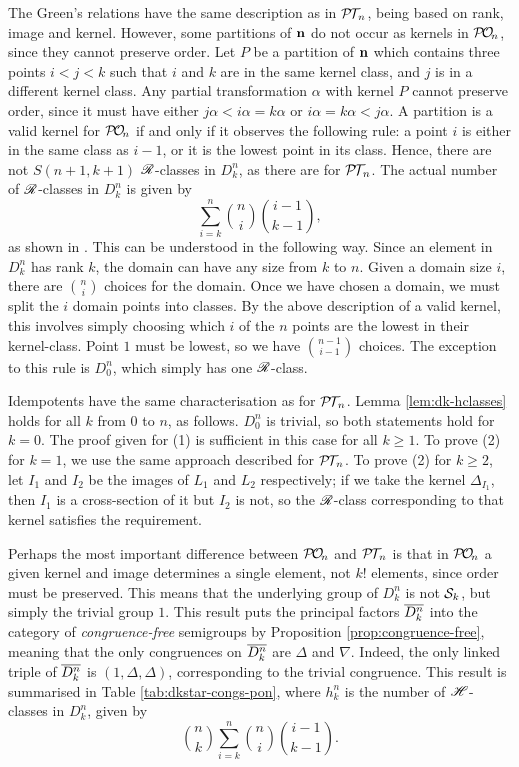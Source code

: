 The Green's relations have the same description as in $\mathcal{P\!T\!}_n$, being based on
rank, image and kernel.  However, some partitions of $\mathbf{n}$ do not occur as
kernels in $\mathcal{P\!O\!}_n$, since they cannot preserve order.  Let $P$ be a partition of
$\mathbf{n}$ which contains three points $i < j < k$ such that $i$ and $k$ are in the
same kernel class, and $j$ is in a different kernel class.  Any partial
transformation $\alpha$ with kernel $P$ cannot preserve order, since it must
have either $j\alpha < i\alpha = k\alpha$ or $i\alpha = k\alpha < j\alpha$.  A
partition is a valid kernel for $\mathcal{P\!O\!}_n$ if and only if it observes the following
rule: a point $i$ is either in the same class as $i-1$, or it is the lowest
point in its class.  Hence, there are not $S(n+1, k+1)$ $\mathrel{\mathscr{R}}$-classes in
$D_k^n$, as there are for $\mathcal{P\!T\!}_n$.  The actual number of $\mathrel{\mathscr{R}}$-classes in
$D_k^n$ is given by
$$\sum_{i=k}^n \binom{n}{i} \binom{i-1}{k-1},$$
as shown in \cite[Lemma 4.1]{pon}.  This can be understood in the following way.
Since an element in $D_k^n$ has rank $k$, the domain can have any size from $k$
to $n$.  Given a domain size $i$, there are $\binom{n}{i}$ choices for the
domain.  Once we have chosen a domain, we must split the $i$ domain points into
classes.  By the above description of a valid kernel, this involves simply
choosing which $i$ of the $n$ points are the lowest in their kernel-class.
Point $1$ must be lowest, so we have $\binom{n-1}{i-1}$ choices.  The exception
to this rule is $D_0^n$, which simply has one $\mathrel{\mathscr{R}}$-class.

Idempotents have the same characterisation as for $\mathcal{P\!T\!}_n$.  Lemma
\ref{lem:dk-hclasses} holds for all $k$ from $0$ to $n$, as follows.  $D_0^n$ is
trivial, so both statements hold for $k=0$.  The proof given for (1) is
sufficient in this case for all $k \geq 1$.  To prove (2) for $k=1$, we use the
same approach described for $\mathcal{P\!T\!}_n$.  To prove (2) for $k \geq 2$, let $I_1$ and
$I_2$ be the images of $L_1$ and $L_2$ respectively; if we take the kernel
$\Delta_{I_1}$, then $I_1$ is a cross-section of it but $I_2$ is not, so the
$\mathrel{\mathscr{R}}$-class corresponding to that kernel satisfies the requirement.

Perhaps the most important difference between $\mathcal{P\!O\!}_n$ and $\mathcal{P\!T\!}_n$ is that in
$\mathcal{P\!O\!}_n$ a given kernel and image determines a single element, not $k!$ elements,
since order must be preserved.  This means that the underlying group of $D_k^n$
is not $\mathcal{S}_k$, but simply the trivial group $1$.  This result puts the
principal factors $\overline{D_k^n}$ into the category of \textit{congruence-free}
semigroups by Proposition \ref{prop:congruence-free}, meaning that the only
congruences on $\overline{D_k^n}$ are $\Delta$ and $\nabla$.  Indeed, the only linked
triple of $\overline{D_k^n}$ is $(1, \Delta, \Delta)$, corresponding to the trivial
congruence.  This result is summarised in Table \ref{tab:dkstar-congs-pon},
where $h_k^n$ is the number of $\mathrel{\mathscr{H}}$-classes in $D_k^n$, given by
$$\binom{n}{k} \sum_{i=k}^n \binom{n}{i} \binom{i-1}{k-1}.$$

